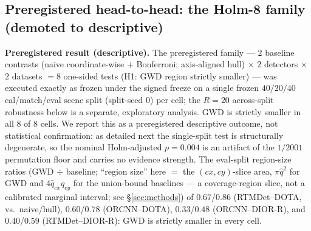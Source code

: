 \documentclass[journal]{IEEEtran}
\begin{document}
\subsection{Preregistered head-to-head: the Holm-8 family (demoted to descriptive)}\label{sec:holm8}
\textbf{Preregistered result (descriptive).} The preregistered family --- $2$ baseline contrasts (naive
coordinate-wise + Bonferroni; axis-aligned hull) $\times$ $2$ detectors $\times$ $2$ datasets $= 8$
one-sided tests (H1: GWD region strictly smaller) --- was executed exactly as frozen under the signed freeze
on a single frozen $40/20/40$ cal/match/eval scene split
(split-seed $0$) per cell; the $R{=}20$ across-split robustness below is a separate, exploratory
analysis. GWD is strictly smaller in all $8$ of $8$ cells. We report this as a preregistered
descriptive outcome, not statistical confirmation: as detailed next the single-split test is
structurally degenerate, so the nominal Holm-adjusted $p=0.004$ is an artifact of the $1/2001$ permutation
floor and carries no evidence strength. The eval-split region-size ratios (GWD $\div$ baseline; ``region size'' here $=$ the
$(cx,cy)$-slice area, $\pi\hat q^2$ for GWD and $4\hat q_{cx}\hat q_{cy}$ for the union-bound baselines
--- a coverage-region slice, not a calibrated marginal interval; see \S\ref{sec:methods}) of
$0.67$/$0.86$ (RTMDet--DOTA, vs.\ naive/hull), $0.60$/$0.78$ (ORCNN--DOTA), $0.33$/$0.48$
(ORCNN--DIOR-R), and $0.40$/$0.59$ (RTMDet--DIOR-R): GWD is strictly smaller in every cell.
\end{document}
